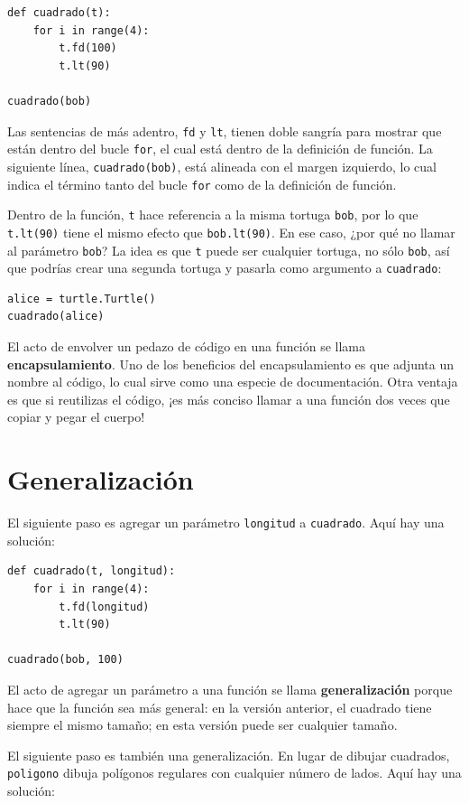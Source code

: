 \documentclass[10pt]{book}
\begin{document}
\begin{verbatim}
def cuadrado(t):
    for i in range(4):
        t.fd(100)
        t.lt(90)

cuadrado(bob)
\end{verbatim}
%
Las sentencias de más adentro, {\tt fd} y {\tt lt}, tienen doble sangría para
mostrar que están dentro del bucle {\tt for}, el cual está dentro de la
definición de función.  La siguiente línea, {\tt cuadrado(bob)}, está alineada con
el margen izquierdo, lo cual indica el término tanto del bucle {\tt for}
como de la definición de función.

Dentro de la función, {\tt t} hace referencia a la misma tortuga {\tt bob}, por lo que
{\tt t.lt(90)} tiene el mismo efecto que {\tt bob.lt(90)}.  En ese
caso, ¿por qué no
llamar al parámetro {\tt bob}?  La idea es que {\tt t} puede ser cualquier
tortuga, no sólo {\tt bob}, así que podrías crear una segunda tortuga y
pasarla como argumento a {\tt cuadrado}:

\begin{verbatim}
alice = turtle.Turtle()
cuadrado(alice)
\end{verbatim}
%
El acto de envolver un pedazo de código en una función se llama {\bf
encapsulamiento}.  Uno de los beneficios del encapsulamiento es que
adjunta un nombre al código, lo cual sirve como una especie de documentación.
Otra ventaja es que si reutilizas el código, ¡es más conciso
llamar a una función dos veces que copiar y pegar el cuerpo!


\section{Generalización}

El siguiente paso es agregar un parámetro {\tt longitud} a {\tt cuadrado}.
Aquí hay una solución:

\begin{verbatim}
def cuadrado(t, longitud):
    for i in range(4):
        t.fd(longitud)
        t.lt(90)

cuadrado(bob, 100)
\end{verbatim}
%
El acto de agregar un parámetro a una función se llama {\bf generalización}
porque hace que la función sea más general: en la versión
anterior, el cuadrado tiene siempre el mismo tamaño; en esta versión
puede ser cualquier tamaño.

El siguiente paso es también una generalización.  En lugar de dibujar
cuadrados, {\tt poligono} dibuja polígonos regulares con cualquier número de
lados.  Aquí hay una solución:
\end{document}
